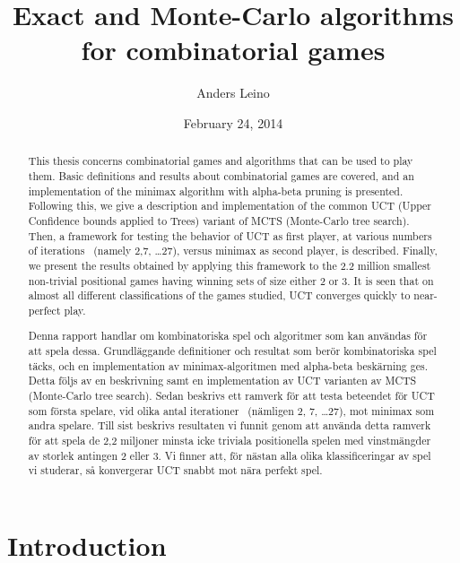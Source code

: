 \documentclass[12pt]{article}
\begin{document}
\title{Exact and Monte-Carlo algorithms for combinatorial games}
\date{February 24, 2014}
\author{Anders Leino}
\maketitle
\begin{abstract}
This thesis concerns combinatorial games and algorithms that can be used to play them.
Basic definitions and results about combinatorial games are covered, and an implementation of the minimax algorithm with alpha-beta pruning is presented.
Following this, we give a description and implementation of the common UCT (Upper Confidence bounds applied to Trees) variant of MCTS (Monte-Carlo tree search).
Then, a framework for testing the behavior of UCT as first player, at various numbers of iterations ~(namely 2,7, \dots 27), versus minimax as second player, is described.
Finally, we present the results obtained by applying this framework to the 2.2 million smallest non-trivial positional games having winning sets of size either 2 or 3.
It is seen that on almost all different classifications of the games studied, UCT converges quickly to near-perfect play.
\end{abstract}
\pagebreak
\renewcommand{\abstractname}{Exakta och Monte-Carlo algoritmer för kombinatoriska spel}
\begin{abstract}
Denna rapport handlar om kombinatoriska spel och algoritmer som kan användas för att spela dessa.
Grundläggande definitioner och resultat som berör kombinatoriska spel täcks, och en implementation av minimax-algoritmen med alpha-beta beskärning ges.
Detta följs av en beskrivning samt en implementation av UCT varianten av MCTS (Monte-Carlo tree search).
Sedan beskrivs ett ramverk för att testa beteendet för UCT som första spelare, vid olika antal iterationer ~(nämligen 2, 7, \dots 27), mot minimax som andra spelare.
Till sist beskrivs resultaten vi funnit genom att använda detta ramverk för att spela de 2,2 miljoner minsta icke triviala positionella spelen med vinstmängder av storlek antingen 2 eller 3.
Vi finner att, för nästan alla olika klassificeringar av spel vi studerar, så konvergerar UCT snabbt mot nära perfekt spel.
\end{abstract}
\pagebreak
\tableofcontents
\pagebreak
\section{Introduction}
\label{sec:introduction}

\end{document}
